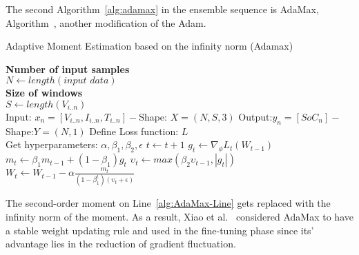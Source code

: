 %
%
The second \mbox{Algorithm~\ref{alg:adamax}} in the ensemble sequence is AdaMax, \mbox{Algorithm~\cite{kingma_adam_2017}}, another modification of the Adam.
\begin{algorithm}
    \caption{Adaptive Moment Estimation based on the infinity norm (Adamax)}
    \begin{algorithmic}[1]
      \STATE \textbf{Number of input samples} \\ $N\gets length(\textit{input data})$\\
      \STATE \textbf{Size of windows} \\ $S\gets length(V_{i..n})$\\
      \STATE Input: $x_n = [V_{i..n}, I_{i..n}, T_{i..n}] - $Shape: $X = (N, S, 3)$
      \STATE Output:$y_n = [SoC_{n}] - $Shape:$Y = (N, 1)$
      \STATE Define Loss function: $L$ \\
             Get hyperparameters: $\alpha, \beta_1, \beta_2, \epsilon$
      \STATE $t \gets t+1$
      \STATE $g_t \gets \nabla_\phi L_t (W_{t-1})$ 
      \STATE $m_t \gets \beta_1 m_{t-1}+(1-\beta_1) g_t $ 
      \STATE $\upsilon_t \gets max\left(\beta_2\upsilon_{t-1}, |g_t|\right) $ 
      \STATE $W_t \gets W_{t-1}- \alpha \frac{m_t}{(1-\beta^t_1)(\upsilon_t+\epsilon)} $ 
      \ENDWHILE
    \end{algorithmic}
    \label{alg:adamax}
\end{algorithm}
The second-order moment on Line~\ref{alg:AdaMax-Line} gets replaced with the infinity norm of the moment.
As a result, Xiao et al.~\cite{xiao_accurate_2019} considered AdaMax to have a stable weight updating rule and used in the fine-tuning phase since its' advantage lies in the reduction of gradient fluctuation. 

